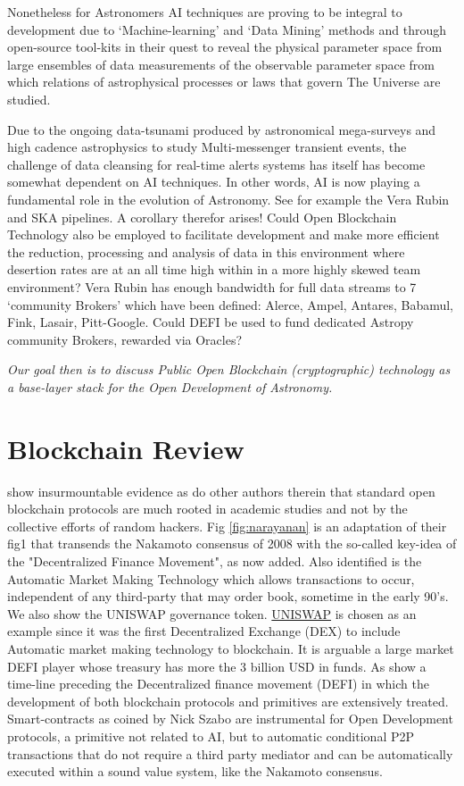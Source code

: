 \documentclass[final,5p,times,twocolumn,authoryear]{elsarticle}
\begin{document}
Nonetheless for Astronomers AI techniques are proving to be integral to development due to `Machine-learning' and `Data Mining' methods and through open-source tool-kits in their quest to reveal the physical parameter space from large ensembles of data measurements of the observable parameter space from which relations of astrophysical processes or laws that govern The Universe are studied. 
 
Due to the ongoing data-tsunami produced by astronomical mega-surveys and high cadence astrophysics to study Multi-messenger transient events, the challenge of data cleansing for real-time alerts systems has itself has become somewhat dependent on AI techniques. In other words, AI is now playing a fundamental role in the evolution of Astronomy. See for example the Vera Rubin and SKA pipelines. A corollary therefor arises! Could Open Blockchain Technology also be employed to facilitate development and make more efficient the reduction, processing and analysis of data in this environment where desertion rates are at an all time high within in a more highly skewed team environment? Vera Rubin has enough bandwidth for full data streams to 7 `community Brokers' which have been defined: Alerce, Ampel, Antares, Babamul, Fink, Lasair, Pitt-Google. Could DEFI be used to fund dedicated Astropy community Brokers, rewarded via Oracles? 

\emph{Our goal then is to discuss Public Open Blockchain (cryptographic) technology as a base-layer stack for the Open Development of Astronomy.}

\section{Blockchain Review}
\label{sec:bc_review}
\cite{20d30b4efb014b21b7ab27f5218692ab} show insurmountable evidence as do other authors therein that standard open blockchain protocols are much rooted in academic studies and not by the collective efforts of random hackers. Fig \ref{fig:narayanan} is an adaptation of their fig1 that transends the Nakamoto consensus of 2008 with the so-called key-idea of the "Decentralized Finance Movement", as now added. Also identified is the Automatic Market Making Technology which allows transactions to occur, independent of any third-party that may  order book, sometime in the early 90's. We also show the UNISWAP governance token. \href{https://github.com/Uniswap}{UNISWAP} is chosen as an example since it was the first Decentralized Exchange (DEX) to include Automatic market making technology to blockchain. It is arguable a large market DEFI player whose treasury has more the 3 billion USD in funds. As show a time-line preceding the Decentralized finance movement (DEFI) in which the development of both blockchain protocols and primitives are extensively treated. Smart-contracts as coined by Nick Szabo are instrumental for Open Development protocols, a primitive not related to AI, but to automatic conditional P2P transactions that do not require a third party mediator and can be automatically executed within a sound value system, like the Nakamoto consensus. 
\end{document}
